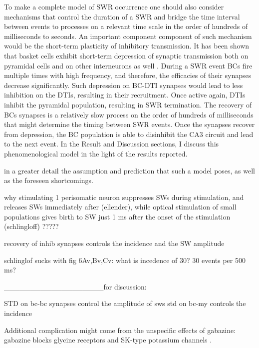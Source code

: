     To make a complete model of SWR occurrence one should also consider
    mechanisms that control the duration of a SWR and bridge the time interval
    between events to processes on a relevant time scale in the order of
    hundreds of milliseconds to seconds. An important component component of
    such mechanism would be the short-term plasticity of inhibitory
    transmission. It has been shown that basket cells exhibit short-term
    depression of synaptic transmission both on pyramidal cells and on other
    interneurons as well \citep{Kraushaar2000, Kohus2016}. During a SWR event
    BCs fire multiple times with high frequency, and therefore, the efficacies
    of their synapses decrease significantly. Such depression on BC-DTI
    synapses would lead to less inhibition on the DTIs, resulting in their
    recruitment. Once active again, DTIs inhibit the pyramidal population,
    resulting in SWR termination. The recovery of BCs synapses is a relatively
    slow process on the order of hundreds of milliseconds \citep{Kohus2016}
    that might determine the timing between SWR events. Once the synapses
    recover from depression, the BC population is able to disinhibit the CA3
    circuit and lead to the next event. In the Result and Discussion sections, I
    discuss this phenomenological model in the light of the results reported.
    
    in a greater detail the assumption and prediction that such a model
    poses, as well as the foreseen shortcomings.

    why stimulating 1 perisomatic neuron suppresses SWs during stimulation, and releases
    SWs immediately after (ellender), while optical stimulation of small populations
    gives birth to SW just 1 ms after the onset of the stimulation (schlingloff) ?????


    recovery of inhib synapses controls the incidence and the SW amplitude

    schlinglof sucks with fig 6Av,Bv,Cv:  what is incedence of 30? 30 events per 500 ms?
    
    ___________________for discussion:%

    STD on bc-bc synapses control the amplitude of sws
    std on bc-my controls the incidence

Additional complication might come from the unspecific effects of gabazine:
gabazine blocks glycine receptors \citep{Shirasaki1991} and SK-type potassium 
channels \citep{Pedarzani2001}.


